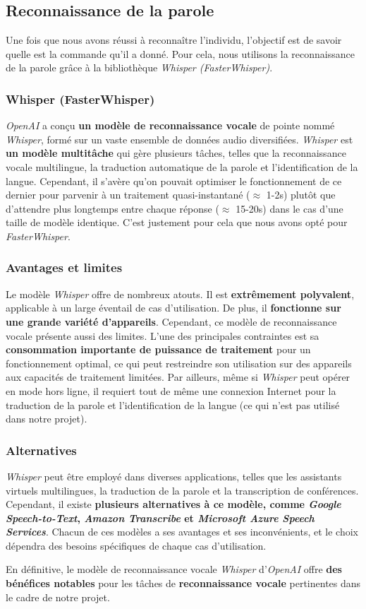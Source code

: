 \subsection{Reconnaissance de la parole}
\label{subsec:Reconnaissance_parole}

Une fois que nous avons réussi à reconnaître l'individu, l'objectif est de savoir quelle est la commande qu'il a donné. Pour cela, nous utilisons la reconnaissance de la 
parole grâce à la bibliothèque \textit{Whisper (FasterWhisper)}.

\subsubsection*{Whisper (FasterWhisper)}

\textit{OpenAI} a conçu \textbf{un modèle de reconnaissance vocale} de pointe nommé \textit{Whisper}, formé sur un vaste ensemble de données audio diversifiées. 
\textit{Whisper} est \textbf{un modèle multitâche} qui gère plusieurs tâches, telles que la reconnaissance vocale multilingue, la traduction automatique de la parole et 
l'identification de la langue. Cependant, il s'avère qu'on pouvait optimiser le fonctionnement de ce dernier pour parvenir à un traitement quasi-instantané ($\approx$ 1-2s) 
plutôt que d'attendre plus longtemps entre chaque réponse ($\approx$ 15-20s) dans le cas d'une taille de modèle identique. C'est justement pour cela que nous avons opté pour \textit{FasterWhisper}.

\subsubsection*{Avantages et limites}
Le modèle \textit{Whisper} offre de nombreux atouts. Il est \textbf{extrêmement polyvalent}, applicable à un large éventail de cas d'utilisation. De plus, il \textbf{fonctionne 
sur une grande variété d'appareils}. Cependant, ce modèle de reconnaissance vocale présente aussi des limites. L'une des principales contraintes est sa \textbf{consommation 
importante de puissance de traitement} pour un fonctionnement optimal, ce qui peut restreindre son utilisation sur des appareils aux capacités de traitement limitées. 
Par ailleurs, même si \textit{Whisper} peut opérer en mode hors ligne, il requiert tout de même une connexion Internet pour la traduction de la parole et l'identification de la langue (ce qui n'est pas utilisé dans notre projet).

\subsubsection*{Alternatives}
\textit{Whisper} peut être employé dans diverses applications, telles que les assistants virtuels multilingues, la traduction de la parole et la transcription de conférences. 
Cependant, il existe \textbf{plusieurs alternatives à ce modèle, comme \textit{Google Speech-to-Text}, \textit{Amazon Transcribe} et \textit{Microsoft Azure Speech Services}}. 
Chacun de ces modèles a ses avantages et ses inconvénients, et le choix dépendra des besoins spécifiques de chaque cas d'utilisation.

En définitive, le modèle de reconnaissance vocale \textit{Whisper} d'\textit{OpenAI} offre \textbf{des bénéfices notables} pour les tâches de \textbf{reconnaissance vocale} pertinentes dans le cadre de notre projet.